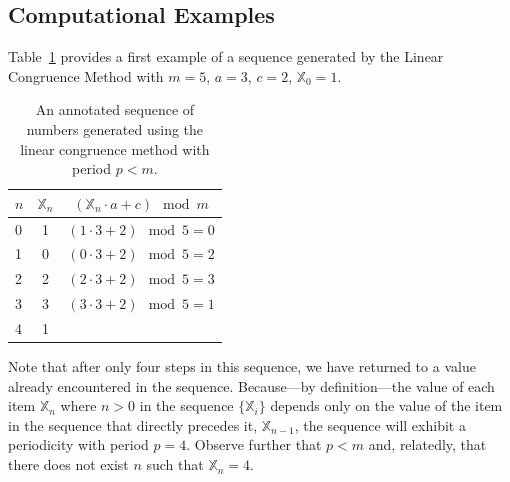 \documentclass{article}
\theoremstyle{break}
\begin{document}
\subsection{Computational Examples}
Table~\ref{short_period_comp_examp} provides a first example of a sequence generated by the Linear Congruence Method with $m = 5$, $a=3$, $c=2$, $\mathbb{X}_0 = 1$.
\begin{table}[htbp]
\centering
\begin{tabular}{l|c|c}
$n$ & $\mathbb{X}_n$ & $(\mathbb{X}_n \cdot a + c) \mod m$  \\\hline
0 & 1 &  $(1 \cdot 3 + 2) \mod 5 = 0$ \\
1 & 0 &  $(0 \cdot 3 + 2) \mod 5 = 2$ \\
2 & 2 &  $(2 \cdot 3 + 2) \mod 5 = 3$ \\
3 & 3 &  $(3 \cdot 3 + 2) \mod 5 = 1$ \\
4 & 1 &   \\
\end{tabular}
\caption{An annotated sequence of numbers generated using the linear congruence method with period $p < m$.}
\label{short_period_comp_examp}
\end{table}
Note that after only four steps in this sequence, we have returned to a value already encountered in the sequence. Because---by definition---the value of each item $\mathbb{X}_n$ where $n > 0$ in the sequence $\{\mathbb{X}_i\}$ depends only on the value of the item in the sequence that directly precedes it, $\mathbb{X}_{n-1}$, the sequence will exhibit a periodicity with period $p = 4$. Observe further that $p < m$ and, relatedly, that there does not exist $n$ such that $\mathbb{X}_n = 4$. 
\end{document}

